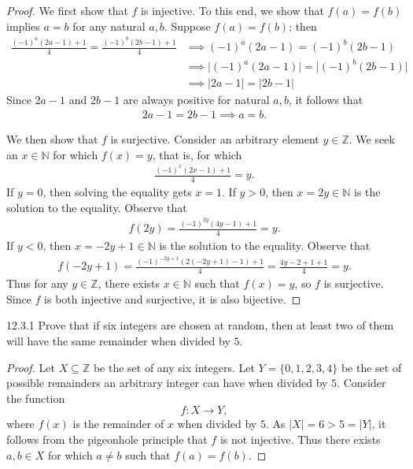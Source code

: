 \documentclass{exam}
\newcommand{\abs}[1]{\lvert#1\rvert}
\begin{document}
\begin{proof}
    We first show that $f$ is injective. To this end, we show that $f(a) = f(b)$ implies $a = b$ for any natural $a, b$. Suppose $f(a) = f(b)$; then
    \begin{align*}
        \frac{(-1)^a(2a-1)+1}4 = \frac{(-1)^b(2b-1)+1}4 &\implies (-1)^a(2a-1) = (-1)^b(2b-1)\\
        &\implies\abs{(-1)^a(2a-1)} = \abs{(-1)^b(2b-1)}\\
        &\implies\abs{2a-1}=\abs{2b-1}
    \end{align*}
    Since $2a - 1$ and $2b - 1$ are always positive for natural $a, b$, it follows that
    \begin{align*}
        2a - 1 = 2b - 1 \implies a = b.
    \end{align*}

    We then show that $f$ is surjective. Consider an arbitrary element $y\in\mathbb Z$. We seek an $x\in\mathbb N$ for which $f(x) = y$, that is, for which
    \begin{align*}
        \frac{(-1)^x(2x-1) + 1}4 = y.
    \end{align*}
    If $y = 0$, then solving the equality gets $x=1$. If $y>0$, then $x = 2y\in\mathbb N$ is the solution to the equality. Observe that
    \begin{align*}
        f(2y) = \frac{(-1)^{2y}(4y-1) + 1}4 = y.
    \end{align*}
    If $y < 0$, then $x = -2y +1\in\mathbb N$ is the solution to the equality. Observe that
    \begin{align*}
        f(-2y + 1) = \frac{(-1)^{-2y+1}(2(-2y+1) - 1) + 1}4 = \frac{4y-2+1+1}4 = y.
    \end{align*}
    Thus for any $y\in\mathbb Z$, there exists $x\in\mathbb N$ such that $f(x) = y$, so $f$ is surjective. Since $f$ is both injective and surjective, it is also bijective.
\end{proof}
\newpage
\begin{problem}{12.3.1}
    Prove that if six integers are chosen at random, then at least two of them will have the same remainder when divided by $5$.
\end{problem}

\begin{proof}
    Let $X\subseteq\mathbb Z$ be the set of any six integers. Let $Y = \{0, 1, 2, 3, 4\}$ be the set of possible remainders an arbitrary integer can have when divided by $5$. Consider the function $$f:X\rightarrow Y,$$ where $f(x)$ is the remainder of $x$ when divided by $5$. As $\abs{X} = 6 > 5 = \abs{Y}$, it follows from the pigeonhole principle that $f$ is not injective. Thus there exists $a, b\in X$ for which $a\neq b$ such that $f(a) = f(b)$.
\end{proof}
\end{document}
